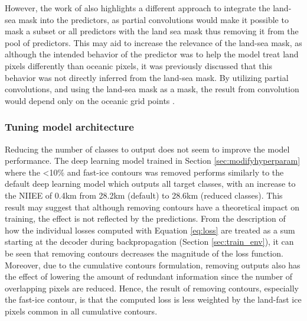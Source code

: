 \documentclass[../main/thesis]{subfiles}
\begin{document}
However, the work of \cite{Liu2018} also highlights a different approach to integrate the land-sea mask into the predictors, as partial convolutions would make it possible to mask a subset or all predictors with the land sea mask thus removing it from the pool of predictors. This may aid to increase the relevance of the land-sea mask, as although the intended behavior of the predictor was to help the model treat land pixels differently than oceanic pixels, it was previously discussed that this behavior was not directly inferred from the land-sea mask. By utilizing partial convolutions, and using the land-sea mask as a mask, the result from convolution would depend only on the oceanic grid points \citep{Liu2018}.

\subsubsection{Tuning model architecture}
Reducing the number of classes to output does not seem to improve the model performance. The deep learning model trained in Section \ref{sec:modifyhyperparam} where the <10\% and fast-ice contours was removed performs similarly to the default deep learning model which outputs all target classes, with an increase to the NIIEE of 0.4km from 28.2km (default) to 28.6km (reduced classes). This result may suggest that although removing contours have a theoretical impact on training, the effect is not reflected by the predictions. From the description of how the individual losses computed with Equation \ref{eq:loss} are treated as a sum starting at the decoder during backpropagation (Section \ref{sec:train_env}), it can be seen that removing contours decreases the magnitude of the loss function. Moreover, due to the cumulative contours formulation, removing outputs also has the effect of lowering the amount of redundant information since the number of overlapping pixels are reduced. Hence, the result of removing contours, especially the fast-ice contour, is that the computed loss is less weighted by the land-fast ice pixels common in all cumulative contours.
\end{document}

